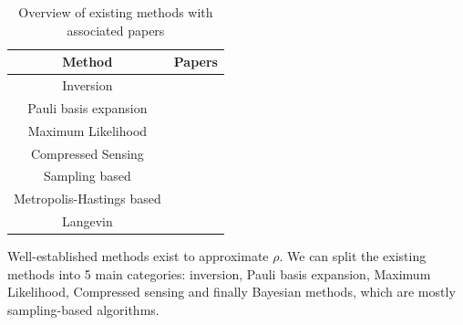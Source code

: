 \documentclass[12pt]{memoir}
\begin{document}
\begin{table}[H]

\begin{center}
    \begin{tabular}{|c|c|}
        \hline
        Method & Papers \\\hline\hline
        Inversion & \cite{meth:linear-inversion:vogel-risken, meth:linear-inversion:RMH, meth:linear-inversion:alquier} \\\hline
        Pauli basis expansion & \cite{Cai-2016}\\\hline
        Maximum Likelihood & \cite{Guta20,meth:ML:BDP,meth:ML:JKMW,meth:ML:Lvovsky,meth:ML:Blume-Kohout,meth:ML:Suzuki,meth:ML:Hradil2004} \\\hline
        Compressed Sensing & \cite{meth:CS:GLFSBE10,meth:CS:Gross-2011, meth:CS:Flammia-2012,meth:CS:Koltchinskii-2011}\\\hline
        Sampling based & \cite{meth:bayesian:smc:Ferrie-2014,meth:bayesian:smc:Kueng-2015, meth:bayesian:smc:Granade_2016,meth:bayesian:sis:Kravtsov-2013}\\\hline
        Metropolis-Hastings based & \cite{MA17,Mai22,LLJL20, meth:bayesian:mh:Blume-Kohout-2010}\\\hline
        Langevin & \cite{meth:bayesian:Langevin:ACMT2024}\\\hline
    \end{tabular}
\end{center}
\caption{Overview of existing methods with associated papers}
\label{table:methods-comp}
\end{table}


Well-established methods exist to approximate $\rho$. We can split the existing methods into 5 main categories: inversion, Pauli basis expansion, Maximum Likelihood, Compressed sensing and finally Bayesian methods, which are mostly sampling-based algorithms.\medbreak
\end{document}
